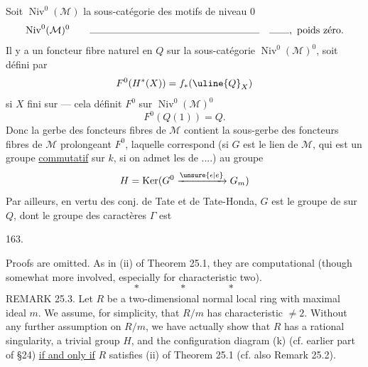 Soit  $\operatorname{Niv}^0(\mathcal M)$ la sous-catégorie des motifs de niveau $0$
\[
\operatorname{Niv}^0(\mathcal M)^0\qquad\rule{6cm}{0.3pt}\quad\rule{0.7cm}{0.3pt},\ \text{poids zéro.}
\]
Il y a un foncteur fibre naturel   en $Q$ sur la sous-catégorie $\operatorname{Niv}^0(\mathcal M)^0$, soit
défini par
\[
F^0(H^*(X))=f_*(\uline{Q}_X)
\]
si $X$ fini sur  --- cela définit $F^0$ sur $\operatorname{Niv}^0(\mathcal M)^0$
\[
F^0(Q(1))=Q.
\]
Donc la gerbe  des foncteurs fibres de $\mathcal M$ contient la sous-gerbe  des foncteurs fibres de $\mathcal M$ prolongeant $F^0$, laquelle correspond (si $G$ est le lien de $\mathcal M$, qui est  un groupe \uline{commutatif} sur $k$, si on admet les  de ....) au groupe
\[
H=\operatorname{Ker}(G^0\xrightarrow{\unsure{\epsilon|e}}G_m)
\]
Par ailleurs,  en vertu des conj. de Tate et de Tate-Honda, $G$ est le groupe de  sur $Q$, dont le groupe des caractères $\Gamma$ est

163.

Proofs are omitted. As in (ii) of Theorem 25.1, they are computational (though somewhat more involved, especially for characteristic two).
\[
*\qquad\qquad *\qquad\qquad *
\]
REMARK 25.3. Let $R$ be a two-dimensional normal local ring with maximal ideal $m$. We assume, for simplicity, that $R/m$ has characteristic $\ne2$. Without any further assumption on $R/m$, we have actually show that $R$ has a rational singularity, a trivial group $H$, and the configuration diagram (k) (cf. earlier part of \S24) \uline{if and only if} $R$ satisfies (ii) of Theorem 25.1 (cf. also Remark 25.2).

